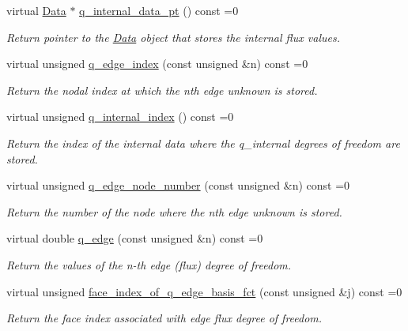 \begin{DoxyCompactItemize}
virtual \hyperlink{classoomph_1_1Data}{Data} $\ast$ \hyperlink{classoomph_1_1DarcyEquations_a989dd3449cb776648590119a4b26c061}{q\+\_\+internal\+\_\+data\+\_\+pt} () const =0
\begin{DoxyCompactList}\small\item\em Return pointer to the \hyperlink{classoomph_1_1Data}{Data} object that stores the internal flux values. \end{DoxyCompactList}\item 
virtual unsigned \hyperlink{classoomph_1_1DarcyEquations_a2df2b20433444d1c8d3a9b6b9525c1ed}{q\+\_\+edge\+\_\+index} (const unsigned \&n) const =0
\begin{DoxyCompactList}\small\item\em Return the nodal index at which the nth edge unknown is stored. \end{DoxyCompactList}\item 
virtual unsigned \hyperlink{classoomph_1_1DarcyEquations_a84f8df62f86028a3519df586a18a3d20}{q\+\_\+internal\+\_\+index} () const =0
\begin{DoxyCompactList}\small\item\em Return the index of the internal data where the q\+\_\+internal degrees of freedom are stored. \end{DoxyCompactList}\item 
virtual unsigned \hyperlink{classoomph_1_1DarcyEquations_a8b16b4fef19d8a785aae3cbf59e3a7cd}{q\+\_\+edge\+\_\+node\+\_\+number} (const unsigned \&n) const =0
\begin{DoxyCompactList}\small\item\em Return the number of the node where the nth edge unknown is stored. \end{DoxyCompactList}\item 
virtual double \hyperlink{classoomph_1_1DarcyEquations_ab66fb06e7f90655229b0eb2b96cf3f1e}{q\+\_\+edge} (const unsigned \&n) const =0
\begin{DoxyCompactList}\small\item\em Return the values of the n-\/th edge (flux) degree of freedom. \end{DoxyCompactList}\item 
virtual unsigned \hyperlink{classoomph_1_1DarcyEquations_a7800978eb25207be715250ad446150c5}{face\+\_\+index\+\_\+of\+\_\+q\+\_\+edge\+\_\+basis\+\_\+fct} (const unsigned \&j) const =0
\begin{DoxyCompactList}\small\item\em Return the face index associated with edge flux degree of freedom. \end{DoxyCompactList}\item 

\end{DoxyCompactItemize}
